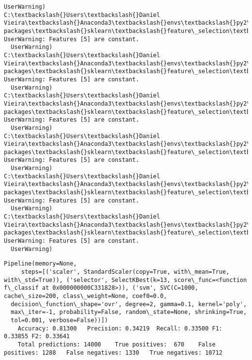 \documentclass[11pt]{article}
\begin{document}
\begin{Verbatim}[commandchars=\\\{\}]
  UserWarning)
C:\textbackslash{}Users\textbackslash{}Daniel Vieira\textbackslash{}Anaconda3\textbackslash{}envs\textbackslash{}py2\textbackslash{}lib\textbackslash{}site-packages\textbackslash{}sklearn\textbackslash{}feature\_selection\textbackslash{}univariate\_selection.py:113: UserWarning: Features [5] are constant.
  UserWarning)
C:\textbackslash{}Users\textbackslash{}Daniel Vieira\textbackslash{}Anaconda3\textbackslash{}envs\textbackslash{}py2\textbackslash{}lib\textbackslash{}site-packages\textbackslash{}sklearn\textbackslash{}feature\_selection\textbackslash{}univariate\_selection.py:113: UserWarning: Features [5] are constant.
  UserWarning)
C:\textbackslash{}Users\textbackslash{}Daniel Vieira\textbackslash{}Anaconda3\textbackslash{}envs\textbackslash{}py2\textbackslash{}lib\textbackslash{}site-packages\textbackslash{}sklearn\textbackslash{}feature\_selection\textbackslash{}univariate\_selection.py:113: UserWarning: Features [5] are constant.
  UserWarning)
C:\textbackslash{}Users\textbackslash{}Daniel Vieira\textbackslash{}Anaconda3\textbackslash{}envs\textbackslash{}py2\textbackslash{}lib\textbackslash{}site-packages\textbackslash{}sklearn\textbackslash{}feature\_selection\textbackslash{}univariate\_selection.py:113: UserWarning: Features [5] are constant.
  UserWarning)
C:\textbackslash{}Users\textbackslash{}Daniel Vieira\textbackslash{}Anaconda3\textbackslash{}envs\textbackslash{}py2\textbackslash{}lib\textbackslash{}site-packages\textbackslash{}sklearn\textbackslash{}feature\_selection\textbackslash{}univariate\_selection.py:113: UserWarning: Features [5] are constant.
  UserWarning)
C:\textbackslash{}Users\textbackslash{}Daniel Vieira\textbackslash{}Anaconda3\textbackslash{}envs\textbackslash{}py2\textbackslash{}lib\textbackslash{}site-packages\textbackslash{}sklearn\textbackslash{}feature\_selection\textbackslash{}univariate\_selection.py:113: UserWarning: Features [5] are constant.
  UserWarning)

    \end{Verbatim}

    \begin{Verbatim}[commandchars=\\\{\}]
Pipeline(memory=None,
     steps=[('scaler', StandardScaler(copy=True, with\_mean=True, with\_std=True)), ('selector', SelectKBest(k=13, score\_func=<function f\_classif at 0x000000000C331828>)), ('svm', SVC(C=1000, cache\_size=200, class\_weight=None, coef0=0.0,
  decision\_function\_shape='ovr', degree=2, gamma=0.1, kernel='poly',
  max\_iter=-1, probability=False, random\_state=None, shrinking=True,
  tol=0.001, verbose=False))])
	Accuracy: 0.81300	Precision: 0.34219	Recall: 0.33500	F1: 0.33855	F2: 0.33641
	Total predictions: 14000	True positives:  670	False positives: 1288	False negatives: 1330	True negatives: 10712


    \end{Verbatim}
\end{document}
